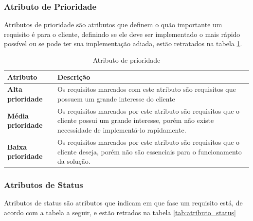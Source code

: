 \subsubsection{Atributo de Prioridade\\}

Atributos de prioridade são atributos que definem o quão importante um requisito é para o cliente, definindo se ele deve ser implementado o mais rápido possível ou se pode ter sua implementação adiada, estão retratados na tabela \ref{tab:atributo_prioridade}.

\begin{table}[H]
\begin{tabular}{|p{4cm}|p{11cm}|}

\hline
\textbf{Atributo} &
\textbf{Descrição}
\\ \hline

\textbf{Alta prioridade} &
Os requisitos marcados com este atributo são requisitos que possuem um grande interesse do cliente
\\ \hline

\textbf{Média prioridade} &
Os requisitos marcados por este atributo são requisitos que o cliente possui um grande interesse, porém não existe necessidade de implementá-lo rapidamente.
\\ \hline

\textbf{Baixa prioridade} &
Os requisitos marcados por este atributo são requisitos que o cliente deseja, porém não são essenciais para o funcionamento da solução.
\\ \hline

\end{tabular}
\caption{Atributo de prioridade}
\label{tab:atributo_prioridade}
\end{table}

\subsubsection{Atributos de Status\\}

Atributos de status são atributos que indicam em que fase um requisito está, de acordo com a tabela a seguir, e estão retrados na tabela \ref{tab:atributo_status}

